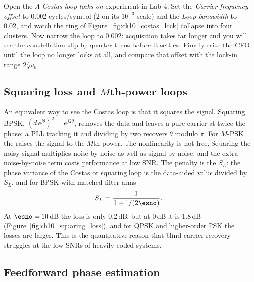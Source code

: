 \begin{tryit}
Open the \emph{A Costas loop locks on} experiment in Lab 4. Set the \emph{Carrier frequency offset}
to 0.002 cycles/symbol (2 on its $10^{-3}$ scale) and the \emph{Loop bandwidth} to 0.02, and watch the ring of Figure~\ref{fig:ch10_costas_lock} collapse into
four clusters. Now narrow the loop to 0.002: acquisition takes far longer and you will see the
constellation slip by quarter turns before it settles. Finally raise the CFO until the loop no
longer locks at all, and compare that offset with the lock-in range $2\zeta\omega_n$.
\end{tryit}

\subsection{Squaring loss and \texorpdfstring{$M$}{M}th-power loops}

An equivalent way to see the Costas loop is that it squares the signal. Squaring BPSK,
$(d\,e^{j\theta})^2=e^{j2\theta}$, removes the data and leaves a pure carrier at twice the phase; a PLL
tracking it and dividing by two recovers $\theta$ modulo $\pi$. For $M$-PSK the  raises the signal to the $M$th power. The nonlinearity is not free. Squaring the noisy signal
multiplies noise by noise as well as signal by noise, and the extra noise-by-noise term costs
performance at low SNR. The penalty is the  $S_L$: the phase variance of the
Costas or squaring loop is the data-aided value divided by $S_L$, and for BPSK with matched-filter arms
\begin{equation}
S_L=\frac{1}{1+1/(2\esno)}.
\end{equation}
At $\esno=10$\,dB the loss is only 0.2\,dB, but at 0\,dB it is 1.8\,dB
(Figure~\ref{fig:ch10_squaring_loss}), and for QPSK and higher-order PSK the losses are larger.
This is the quantitative reason that blind carrier recovery struggles at the low SNRs of heavily
coded systems.


\subsection{Feedforward phase estimation}


